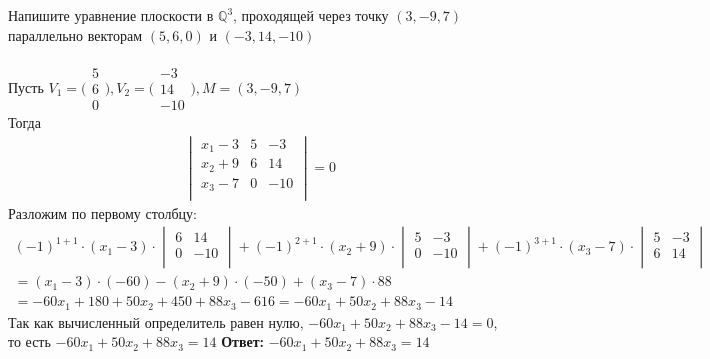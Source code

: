 		
		
		\subsection{}		
		Напишите уравнение плоскости в $\mathbb{Q}^{3}$, проходящей через точку $(3, -9, 7)$ параллельно векторам $(5, 6, 0)$ и $(-3, 14, -10)$\\
		\\
		Пусть 
		$V_{1} = 
		\Bigg(\begin{array}{c}
		5\\ 6\\ 0
		\end{array}\Bigg),
		V_{2} = \Bigg(\begin{array}{c}
		-3\\ 14\\ -10
		\end{array}\Bigg), 
		M = (3, -9, 7)$ 
		\\ 
		Тогда 
		\begin{gather*}
			\begin{vmatrix}
				x_{1} - 3 & 5 & -3\\
				x_{2} + 9 & 6 & 14\\
				x_{3} - 7 & 0 & -10\\
			\end{vmatrix} = 0
		\end{gather*}
		Разложим по первому столбцу: 
		\begin{gather*}
			(-1)^{1 + 1} \cdot (x_{1} - 3) \cdot 
			\begin{vmatrix}
				6 & 14\\
				0 & -10\\
			\end{vmatrix}
			+ (-1)^{2 + 1} \cdot (x_{2} + 9) \cdot
			\begin{vmatrix}
				5 & -3\\
				0 & -10\\
			\end{vmatrix} 
			+ (-1)^{3 + 1} \cdot (x_{3} - 7) \cdot
			\begin{vmatrix}
				5 & -3\\
				6 & 14\\
			\end{vmatrix} 
			\\
			= (x_{1} - 3) \cdot (-60) - (x_{2} + 9) \cdot (-50) + (x_{3} - 7) \cdot 88\\
			= -60x_{1} + 180 + 50x_{2} + 450 + 88x_{3} - 616 = -60x_{1} + 50x_{2} + 88x_{3} - 14
		\end{gather*}
		Так как вычисленный определитель равен нулю, $-60x_{1} + 50x_{2} + 88x_{3} - 14 = 0$, то есть $-60x_{1} + 50x_{2} + 88x_{3} = 14$ 
		\textbf{Ответ:} $-60x_{1} + 50x_{2} + 88x_{3} = 14$ 
		
